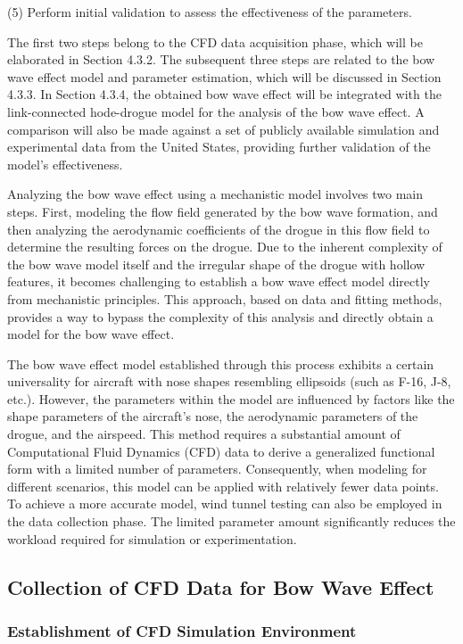 (5) Perform initial validation to assess the effectiveness of the parameters.

The first two steps belong to the CFD data acquisition phase, which will be elaborated in Section 4.3.2. The subsequent three steps are related to the bow wave effect model and parameter estimation, which will be discussed in Section 4.3.3. In Section 4.3.4, the obtained bow wave effect will be integrated with the link-connected hode-drogue model for the analysis of the bow wave effect. A comparison will also be made against a set of publicly available simulation and experimental data from the United States, providing further validation of the model's effectiveness.

Analyzing the bow wave effect using a mechanistic model involves two main steps. First, modeling the flow field generated by the bow wave formation, and then analyzing the aerodynamic coefficients of the drogue in this flow field to determine the resulting forces on the drogue. Due to the inherent complexity of the bow wave model itself and the irregular shape of the drogue with hollow features, it becomes challenging to establish a bow wave effect model directly from mechanistic principles. This approach, based on data and fitting methods, provides a way to bypass the complexity of this analysis and directly obtain a model for the bow wave effect.

The bow wave effect model established through this process exhibits a certain universality for aircraft with nose shapes resembling ellipsoids (such as F-16, J-8, etc.). However, the parameters within the model are influenced by factors like the shape parameters of the aircraft's nose, the aerodynamic parameters of the drogue, and the airspeed. This method requires a substantial amount of Computational Fluid Dynamics (CFD) data to derive a generalized functional form with a limited number of parameters. Consequently, when modeling for different scenarios, this model can be applied with relatively fewer data points. To achieve a more accurate model, wind tunnel testing can also be employed in the data collection phase. The limited parameter amount significantly reduces the workload required for simulation or experimentation.

\subsection{Collection of CFD Data for Bow Wave Effect}

\subsubsection{Establishment of CFD Simulation Environment}

